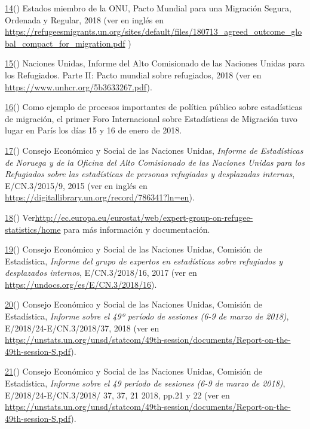 \documentclass[
]{book}
\begin{document}
\protect\hyperlink{sdfootnote14anc}{14}() Estados miembro de la ONU, Pacto Mundial para una Migración Segura, Ordenada y Regular, 2018 (ver en inglés en \url{https://refugeesmigrants.un.org/sites/default/files/180713_agreed_outcome_global_compact_for_migration.pdf} )

\protect\hyperlink{sdfootnote15anc}{15}() Naciones Unidas, Informe del Alto Comisionado de las Naciones Unidas para los Refugiados. Parte II: Pacto mundial sobre refugiados, 2018 (ver en \href{https://www.acnur.org/excom/ag_inf/5c6c3eed4/informe-del-alto-comisionado-de-las-naciones-unidas-para-los-refugiados.html}{https://www.unhcr.org/5b3633267.pdf}).

\protect\hyperlink{sdfootnote16anc}{16}() Como ejemplo de procesos importantes de política público sobre estadísticas de migración, el primer Foro Internacional sobre Estadísticas de Migración tuvo lugar en París los días 15 y 16 de enero de 2018.

\protect\hyperlink{sdfootnote17anc}{17}() Consejo Económico y Social de las Naciones Unidas, \emph{Informe de Estadísticas de Noruega y de la Oficina del Alto Comisionado de las Naciones Unidas para los Refugiados sobre las estadísticas de personas refugiadas y desplazadas internas}, E/CN.3/2015/9, 2015 (ver en inglés en \url{https://digitallibrary.un.org/record/786341?ln=en}).

\protect\hyperlink{sdfootnote18anc}{18}() Ver\url{http://ec.europa.eu/eurostat/web/expert-group-on-refugee-statistics/home} para más información y documentación.

\protect\hyperlink{sdfootnote19anc}{19}() Consejo Económico y Social de las Naciones Unidas, Comisión de Estadística, \emph{Informe del grupo de expertos en estadísticas sobre refugiados y desplazados internos}, E/CN.3/2018/16, 2017 (ver en \url{https://undocs.org/es/E/CN.3/2018/16}).

\protect\hyperlink{sdfootnote20anc}{20}() Consejo Económico y Social de las Naciones Unidas, Comisión de Estadística, \emph{Informe sobre el 49º período de sesiones (6-9 de marzo de 2018)}, E/2018/24-E/CN.3/2018/37, 2018 (ver en \url{https://unstats.un.org/unsd/statcom/49th-session/documents/Report-on-the-49th-session-S.pdf}).

\protect\hyperlink{sdfootnote21anc}{21}() Consejo Económico y Social de las Naciones Unidas, Comisión de Estadística, \emph{Informe sobre el 49 período de sesiones (6-9 de marzo de 2018)}, E/2018/24-E/CN.3/2018/ 37, 37, 21 2018, pp.21 y 22 (ver en \url{https://unstats.un.org/unsd/statcom/49th-session/documents/Report-on-the-49th-session-S.pdf}).
\end{document}
